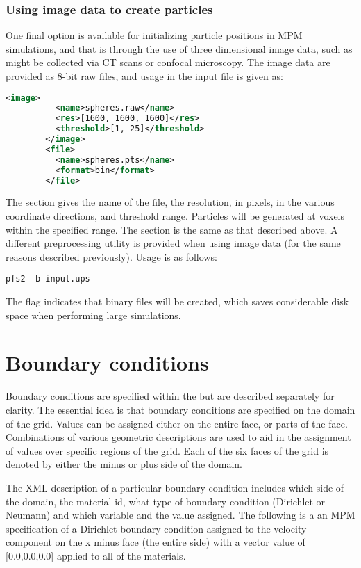 \subsubsection{Using image data to create particles}
One final option is available for initializing particle positions in MPM
simulations, and that is through the use of three dimensional image data,
such as might be collected via CT scans or confocal microscopy.  The image data are 
provided as 8-bit raw files, and usage in the input file is given as:
\begin{lstlisting}[language=XML]
        <image>
          <name>spheres.raw</name>
          <res>[1600, 1600, 1600]</res>
          <threshold>[1, 25]</threshold>
        </image>
        <file>
          <name>spheres.pts</name>
          <format>bin</format>
        </file>
\end{lstlisting}
The  section gives the name of the file, the resolution, in pixels,
in the various coordinate directions, and threshold range.  Particles will be
generated at voxels within the specified range.  The 
section is the same as that described above.  A different preprocessing utility
is provided when using image data (for the same reasons described previously).
Usage is as follows:
\begin{lstlisting}[backgroundcolor=\color{background}]
   pfs2 -b input.ups
\end{lstlisting}
The  flag indicates that binary  files will be created, which
saves considerable disk space when performing large simulations.

\section{Boundary conditions}\label{sec:ucf_bc}

Boundary conditions are specified within the 
but are described separately for clarity.  The essential idea is that
boundary conditions are specified on the domain of the grid.  Values
can be assigned either on the entire face, or parts of the face.
Combinations of various geometric descriptions are used to aid in the
assignment of values over specific regions of the grid.  Each of the
six faces of the grid is denoted by either the minus or plus side of
the domain.

The XML description of a particular boundary condition includes which
side of the domain, the material id, what type of boundary condition
(Dirichlet or Neumann) and which variable and the value assigned.  The
following is a an MPM specification of a Dirichlet boundary condition
assigned to the velocity component on the x minus face (the entire
side) with a vector value of [0.0,0.0,0.0] applied to all of the materials.

